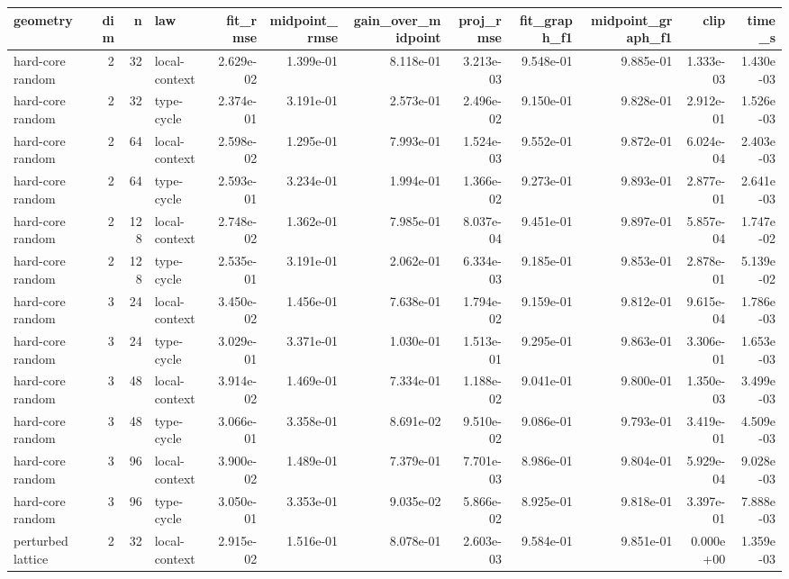 \begin{tabular}{lrrlrrrrrrrr}
\toprule
geometry & dim & n & law & fit_rmse & midpoint_rmse & gain_over_midpoint & proj_rmse & fit_graph_f1 & midpoint_graph_f1 & clip & time_s \\
\midrule
hard-core random & 2 & 32 & local-context & 2.629e-02 & 1.399e-01 & 8.118e-01 & 3.213e-03 & 9.548e-01 & 9.885e-01 & 1.333e-03 & 1.430e-03 \\
hard-core random & 2 & 32 & type-cycle & 2.374e-01 & 3.191e-01 & 2.573e-01 & 2.496e-02 & 9.150e-01 & 9.828e-01 & 2.912e-01 & 1.526e-03 \\
hard-core random & 2 & 64 & local-context & 2.598e-02 & 1.295e-01 & 7.993e-01 & 1.524e-03 & 9.552e-01 & 9.872e-01 & 6.024e-04 & 2.403e-03 \\
hard-core random & 2 & 64 & type-cycle & 2.593e-01 & 3.234e-01 & 1.994e-01 & 1.366e-02 & 9.273e-01 & 9.893e-01 & 2.877e-01 & 2.641e-03 \\
hard-core random & 2 & 128 & local-context & 2.748e-02 & 1.362e-01 & 7.985e-01 & 8.037e-04 & 9.451e-01 & 9.897e-01 & 5.857e-04 & 1.747e-02 \\
hard-core random & 2 & 128 & type-cycle & 2.535e-01 & 3.191e-01 & 2.062e-01 & 6.334e-03 & 9.185e-01 & 9.853e-01 & 2.878e-01 & 5.139e-02 \\
hard-core random & 3 & 24 & local-context & 3.450e-02 & 1.456e-01 & 7.638e-01 & 1.794e-02 & 9.159e-01 & 9.812e-01 & 9.615e-04 & 1.786e-03 \\
hard-core random & 3 & 24 & type-cycle & 3.029e-01 & 3.371e-01 & 1.030e-01 & 1.513e-01 & 9.295e-01 & 9.863e-01 & 3.306e-01 & 1.653e-03 \\
hard-core random & 3 & 48 & local-context & 3.914e-02 & 1.469e-01 & 7.334e-01 & 1.188e-02 & 9.041e-01 & 9.800e-01 & 1.350e-03 & 3.499e-03 \\
hard-core random & 3 & 48 & type-cycle & 3.066e-01 & 3.358e-01 & 8.691e-02 & 9.510e-02 & 9.086e-01 & 9.793e-01 & 3.419e-01 & 4.509e-03 \\
hard-core random & 3 & 96 & local-context & 3.900e-02 & 1.489e-01 & 7.379e-01 & 7.701e-03 & 8.986e-01 & 9.804e-01 & 5.929e-04 & 9.028e-03 \\
hard-core random & 3 & 96 & type-cycle & 3.050e-01 & 3.353e-01 & 9.035e-02 & 5.866e-02 & 8.925e-01 & 9.818e-01 & 3.397e-01 & 7.888e-03 \\
perturbed lattice & 2 & 32 & local-context & 2.915e-02 & 1.516e-01 & 8.078e-01 & 2.603e-03 & 9.584e-01 & 9.851e-01 & 0.000e+00 & 1.359e-03 \\

\end{tabular}
